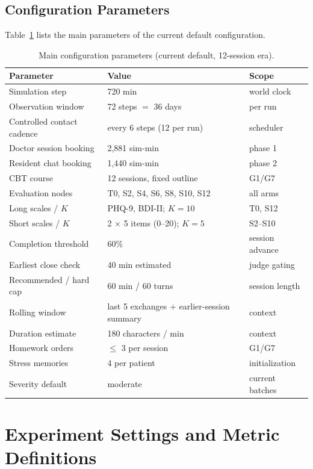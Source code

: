 \documentclass[10pt]{article}
\begin{document}
\subsection{Configuration Parameters}

Table~\ref{tab:config} lists the main parameters of the current default configuration.

\begin{table}[h]
\centering
\caption{Main configuration parameters (current default, 12-session era).}
\label{tab:config}
\small
\begin{tabular}{@{}lll@{}}
\toprule
Parameter & Value & Scope \\
\midrule
Simulation step & 720 min & world clock \\
Observation window & 72 steps $=$ 36 days & per run \\
Controlled contact cadence & every 6 steps (12 per run) & scheduler \\
Doctor session booking & 2{,}881 sim-min & phase 1 \\
Resident chat booking & 1{,}440 sim-min & phase 2 \\
CBT course & 12 sessions, fixed outline & G1/G7 \\
Evaluation nodes & T0, S2, S4, S6, S8, S10, S12 & all arms \\
Long scales / $K$ & PHQ-9, BDI-II; $K=10$ & T0, S12 \\
Short scales / $K$ & 2 $\times$ 5 items (0--20); $K=5$ & S2--S10 \\
Completion threshold & 60\% & session advance \\
Earliest close check & 40 min estimated & judge gating \\
Recommended / hard cap & 60 min / 60 turns & session length \\
Rolling window & last 5 exchanges $+$ earlier-session summary & context \\
Duration estimate & 180 characters / min & context \\
Homework orders & $\le$ 3 per session & G1/G7 \\
Stress memories & 4 per patient & initialization \\
Severity default & moderate & current batches \\
\bottomrule
\end{tabular}
\end{table}

\section{Experiment Settings and Metric Definitions}\label{app:settings}
\end{document}
